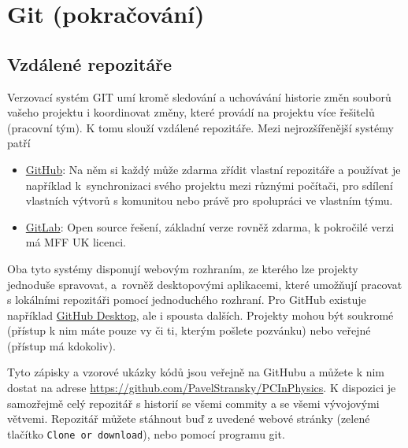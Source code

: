 \documentclass[a4paper,11pt,twoside]{article}
\def\code#1{\textnormal{\texttt{#1}}}
\begin{document}
\section{Git (pokračování)}
    \subsection{Vzdálené repozitáře}\label{sec:GITRemote}
        Verzovací systém GIT umí kromě sledování a uchovávání historie změn souborů vašeho projektu i koordinovat změny, které provádí na projektu více řešitelů (pracovní tým). 
        K tomu slouží vzdálené repozitáře.
        Mezi nejrozšířenější systémy patří
        \begin{itemize}
        \item \href{https://github.com}{GitHub}: 
            Na něm si každý může zdarma zřídit vlastní repozitáře a používat je například k~synchronizaci svého projektu mezi různými počítači, pro sdílení vlastních výtvorů s komunitou nebo právě pro spolupráci ve vlastním týmu. 
        \item \href{https://gitlab.mff.cuni.cz}{GitLab}: 
            Open source řešení, základní verze rovněž zdarma, k pokročilé verzi má MFF UK licenci.
        \end{itemize}
        Oba tyto systémy disponují webovým rozhraním, ze kterého lze projekty jednoduše spravovat, a~rovněž desktopovými aplikacemi, které umožňují pracovat s lokálními repozitáři pomocí jednoduchého rozhraní.
        Pro GitHub existuje například \href{https://desktop.github.com}{GitHub Desktop}, ale i spousta dalších.
        Projekty mohou být soukromé (přístup k nim máte pouze vy či ti, kterým pošlete pozvánku) nebo veřejné (přístup má kdokoliv).

        Tyto zápisky a vzorové ukázky kódů jsou veřejně na GitHubu a můžete k nim dostat na adrese \url{https://github.com/PavelStransky/PCInPhysics}.
        K dispozici je samozřejmě celý repozitář s historií se všemi commity a se všemi vývojovými větvemi.
        Repozitář můžete stáhnout buď z uvedené webové stránky (zelené tlačítko \code{Clone or download}), nebo pomocí programu git.
\end{document}
